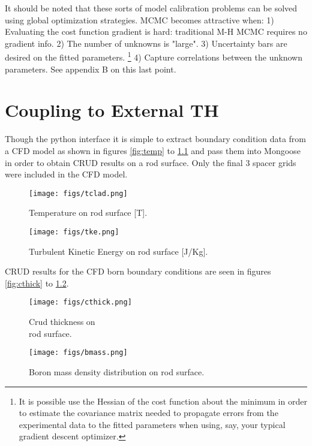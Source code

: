 \documentclass[10pt,a4paper]{report}
\begin{document}
It should be noted that these sorts of model calibration problems can be solved using global optimization strategies.  MCMC becomes attractive when: 1) Evaluating the cost function gradient is hard: traditional M-H MCMC requires no gradient info. 2) The number of unknowns is "large". 3) Uncertainty bars are desired on the fitted parameters. \footnote{It is possible use the Hessian of the cost function about the minimum in order to estimate the covariance matrix needed to propagate errors from the experimental data to the fitted parameters when using, say, your typical gradient descent optimizer.}
 4) Capture correlations between the unknown parameters.  See appendix B on this last point.


\chapter{Coupling to External TH}

Though the python interface it is simple to extract boundary condition data from a CFD model as shown in figures \ref{fig:temp} to \ref{fig:tke} and pass them into Mongoose in order to obtain CRUD results on a rod surface.  Only the final 3 spacer grids were included in the CFD model.

\begin{figure}
    \centering
    \begin{minipage}{.5\textwidth}
        \centering
        \texttt{[image: figs/tclad.png]}
        \caption{Temperature on rod surface [T]. \label{fig:temp}}
    \end{minipage}%
    \begin{minipage}{.5\textwidth}
        \centering
        \texttt{[image: figs/tke.png]}
        \caption{Turbulent Kinetic Energy on rod surface [J/Kg]. \label{fig:tke}}
    \end{minipage}
\end{figure}
CRUD results for the CFD born boundary conditions are seen in figures \ref{fig:cthick} to \ref{fig:bmass}.
\begin{figure}
    \centering
    \begin{minipage}{.5\textwidth}
        \centering
        \texttt{[image: figs/cthick.png]}
        \caption{Crud thickness on \\
        rod surface. \label{fig:cthick}}
    \end{minipage}%
    \begin{minipage}{.5\textwidth}
        \centering
        \texttt{[image: figs/bmass.png]}
        \caption{Boron mass density distribution on rod surface. \label{fig:bmass}}
    \end{minipage}
\end{figure}
\end{document}
